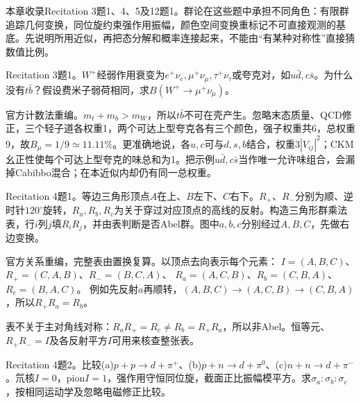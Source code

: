 本章收录Recitation 3题1、4、5及12题1。群论在这些题中承担不同角色：有限群追踪几何变换，同位旋约束强作用振幅，颜色空间变换重标记不可直接观测的基底。先说明所用近似，再把态分解和概率连接起来，不能由“有某种对称性”直接猜数值比例。
\begin{exercise}\label{ex:rec-3-1}
Recitation 3题1。$W^+$经弱作用衰变为$e^+\nu_e,\mu^+\nu_\mu,\tau^+\nu_\tau$或夸克对，如$u\bar d,c\bar s$。为什么没有$t\bar b$？假设费米子弱荷相同，求$B(W^+\to\mu^+\nu_\mu)$。
\end{exercise}
\begin{solution}
官方计数法重编。$m_t+m_b>m_W$，所以$t\bar b$不可在壳产生。忽略末态质量、QCD修正，三个轻子道各权重1，两个可达上型夸克各有三个颜色，强子权重共6，总权重9，故$B_\mu=1/9\simeq11.11\%$。更准确地说，各$u,c$可与$d,s,b$结合，权重$3|V_{ij}|^2$；CKM幺正性使每个可达上型夸克的味总和为1。把示例$u\bar d,c\bar s$当作唯一允许味组合，会漏掉Cabibbo混合；在本近似内却仍有同一总权重。
\end{solution}
\begin{exercise}\label{ex:rec-4-1}
Recitation 4题1。等边三角形顶点$A$在上、$B$左下、$C$右下。$R_+$、$R_-$分别为顺、逆时针$120^\circ$旋转，$R_a,R_b,R_c$为关于穿过对应顶点的高线的反射。构造三角形群乘法表，行$i$列$j$填$R_iR_j$，并由表判断是否Abel群。图中$a,b,c$分别经过$A,B,C$，先做右边变换。
\begin{center}\end{center}
\end{exercise}
\begin{solution}
官方关系重编，完整表由置换复算。以顶点去向表示每个元素：
$I=(A,B,C)$、$R_+=(C,A,B)$、$R_-=(B,C,A)$、
$R_a=(A,C,B)$、$R_b=(C,B,A)$、$R_c=(B,A,C)$。
例如先反射$a$再顺转，$(A,B,C)\to(A,C,B)\to(C,B,A)$，所以$R_+R_a=R_b$。

表不关于主对角线对称：$R_aR_+=R_c\ne R_b=R_+R_a$，所以非Abel。恒等元、$R_+R_-=I$及各反射平方$I$可用来核查整张表。
\end{solution}
\begin{exercise}\label{ex:rec-4-2}
Recitation 4题2。比较(a)$p+p\to d+\pi^+$、(b)$p+n\to d+\pi^0$、(c)$n+n\to d+\pi^-$。氘核$I=0$，pion$I=1$，强作用守恒同位旋，截面正比振幅模平方。求$\sigma_a:\sigma_b:\sigma_c$，按相同运动学及忽略电磁修正比较。
\end{exercise}
